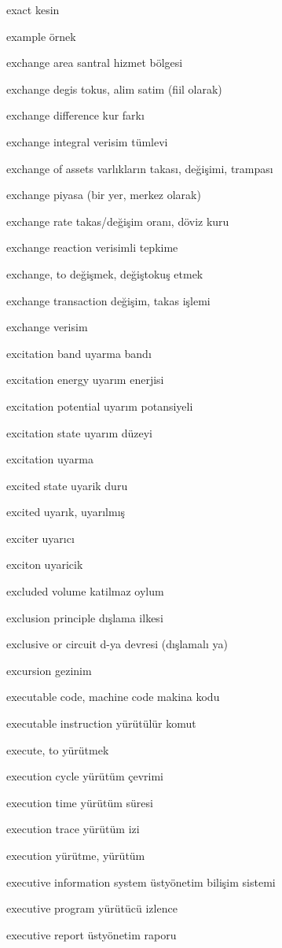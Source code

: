 \documentclass[12pt,fleqn]{article}\usepackage{../../common}
\begin{document}
exact kesin

example örnek

exchange area santral hizmet bölgesi

exchange degis tokus, alim satim (fiil olarak)

exchange difference kur farkı

exchange integral verisim tümlevi

exchange of assets varlıkların takası, değişimi, trampası

exchange piyasa (bir yer, merkez olarak)

exchange rate takas/değişim oranı, döviz kuru

exchange reaction verisimli tepkime

exchange, to değişmek, değiştokuş etmek

exchange transaction değişim, takas işlemi

exchange verisim

excitation band uyarma bandı

excitation energy uyarım enerjisi

excitation potential uyarım potansiyeli

excitation state uyarım düzeyi

excitation uyarma

excited state uyarik duru

excited uyarık, uyarılmış

exciter uyarıcı

exciton uyaricik

excluded volume katilmaz oylum

exclusion principle dışlama ilkesi

exclusive or circuit d-ya devresi (dışlamalı ya)

excursion gezinim

executable code, machine code makina kodu

executable instruction yürütülür komut

execute, to yürütmek

execution cycle yürütüm çevrimi

execution time yürütüm süresi

execution trace yürütüm izi

execution yürütme, yürütüm

executive information system üstyönetim bilişim sistemi

executive program yürütücü izlence

executive report üstyönetim raporu
\end{document}
